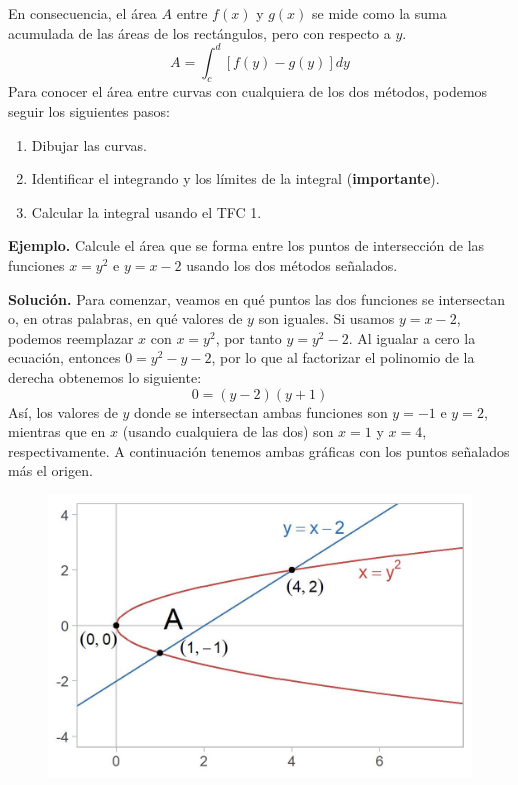 \documentclass[12pt]{article}
\begin{document}
En consecuencia, el área $A$ entre $f(x)$ y $g(x)$ se mide como la suma acumulada de las áreas de los rectángulos, pero con respecto a $y$.
\[
  A = \int_{c}^{d} [f(y) - g(y)] dy
\]
Para conocer el área entre curvas con cualquiera de los dos métodos, podemos seguir los siguientes pasos:

\begin{enumerate}
\item Dibujar las curvas.
\item Identificar el integrando y los límites de la integral ({\bf importante}).
\item Calcular la integral usando el TFC 1.
\end{enumerate}

\textbf{Ejemplo.} \quad Calcule el área que se forma entre los puntos de intersección de las funciones $x = y^{2}$ e $y = x - 2$ usando los dos métodos señalados.

\textbf{Solución.} \quad Para comenzar, veamos en qué puntos las dos funciones se intersectan o, en otras palabras, en qué valores de $y$ son iguales. Si usamos $y = x - 2$, podemos reemplazar $x$ con $x = y^{2}$, por tanto $y = y^{2} - 2$. Al igualar a cero la ecuación, entonces $0 = y^{2} - y - 2$, por lo que al factorizar el polinomio de la derecha obtenemos lo siguiente:
\[
  0 = (y - 2)(y + 1)
\]
Así, los valores de $y$ donde se intersectan ambas funciones son $y = -1$ e $y = 2$, mientras que en $x$ (usando cualquiera de las dos) son $x = 1$ y $x = 4$, respectivamente. A continuación tenemos ambas gráficas con los puntos señalados más el origen.

\begin{figure}[hbt!]
\centering
\includegraphics[scale=0.7]{img/example_init_plot.jpg}
\end{figure}
\end{document}
